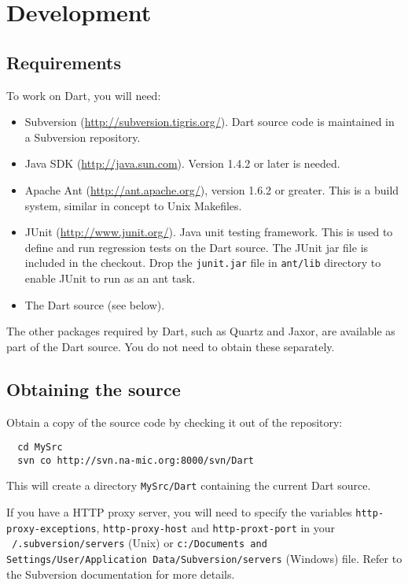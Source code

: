 \documentclass{InsightBook}
\newcommand{\filename}[1]{\texttt{#1}}
\begin{document}
\chapter{Development}
\section{Requirements}
\label{Section:Development}

To work on Dart, you will need:
\begin{itemize}
\item Subversion (\url{http://subversion.tigris.org/}). Dart source code is
  maintained in a Subversion repository.
\item Java SDK (\url{http://java.sun.com}).  Version 1.4.2 or later is
needed.
\item Apache Ant (\url{http://ant.apache.org/}), version 1.6.2 or
  greater. This is a build system, similar in concept to Unix
  Makefiles.
\item JUnit (\url{http://www.junit.org/}). Java unit testing
  framework. This is used to define and run regression tests on the
  Dart source.  The JUnit jar file is included in the checkout.  Drop
the \filename{junit.jar} file in \filename{ant/lib} directory to enable
JUnit to run as an ant task.
\item The Dart source (see below).
\end{itemize}

The other packages required by Dart, such as Quartz and Jaxor, are
available as part of the Dart source. You do not need to obtain these
separately.

\section{Obtaining the source}

Obtain a copy of the source code by checking it out of the repository:
\begin{verbatim}
  cd MySrc
  svn co http://svn.na-mic.org:8000/svn/Dart
\end{verbatim}
This will create a directory \filename{MySrc/Dart} containing the
current Dart source.

If you have a HTTP proxy server, you will need to specify the
variables \texttt{http-proxy-exceptions}, \texttt{http-proxy-host} and
\texttt{http-proxt-port} in your \filename{~/.subversion/servers} (Unix)
or \filename{c:/Documents and Settings/User/Application
Data/Subversion/servers} (Windows)
file. Refer to the Subversion documentation for more details.
\end{document}
